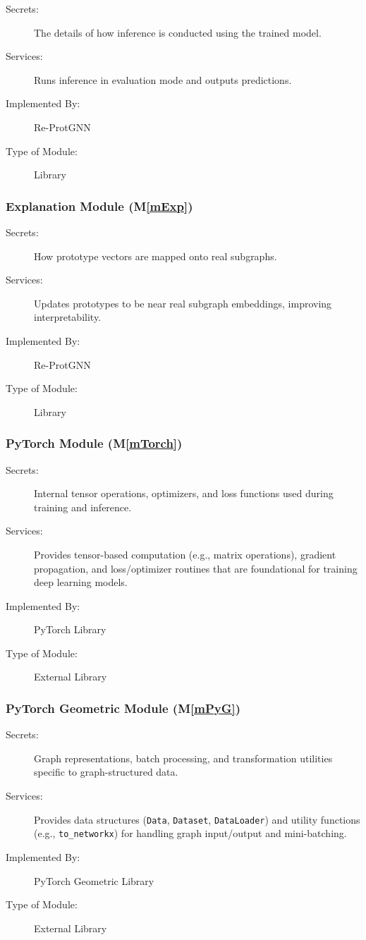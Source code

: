 \documentclass[12pt, titlepage]{article}
\newcommand{\mref}[1]{M\ref{#1}}
\begin{document}
\begin{description}
\item[Secrets:] The details of how inference is conducted using the trained model.

\item[Services:] Runs inference in evaluation mode and outputs predictions.

\item[Implemented By:] Re-ProtGNN
\item[Type of Module:] Library
\end{description}


\subsubsection{Explanation Module
 (\mref{mExp})}

\begin{description}
\item[Secrets:] How prototype vectors are mapped onto real subgraphs.

\item[Services:] Updates prototypes to be near real subgraph embeddings, improving interpretability.

\item[Implemented By:] Re-ProtGNN
\item[Type of Module:] Library
\end{description}


\subsubsection{PyTorch Module (\mref{mTorch})}
\begin{description} 
\item[Secrets:] Internal tensor operations, optimizers, and loss functions used during training and inference. \item[Services:] Provides tensor-based computation (e.g., matrix operations), gradient propagation, and loss/optimizer routines that are foundational for training deep learning models. 
\item[Implemented By:] PyTorch Library 
\item[Type of Module:] External Library \end{description}

\subsubsection{PyTorch Geometric Module (\mref{mPyG})}
\begin{description} 
\item[Secrets:] Graph representations, batch processing, and transformation utilities specific to graph-structured data. \item[Services:] Provides data structures (\texttt{Data}, \texttt{Dataset}, \texttt{DataLoader}) and utility functions (e.g., \texttt{to\_networkx}) for handling graph input/output and mini-batching. 
\item[Implemented By:] PyTorch Geometric Library 
\item[Type of Module:] External Library \end{description}
\end{document}
